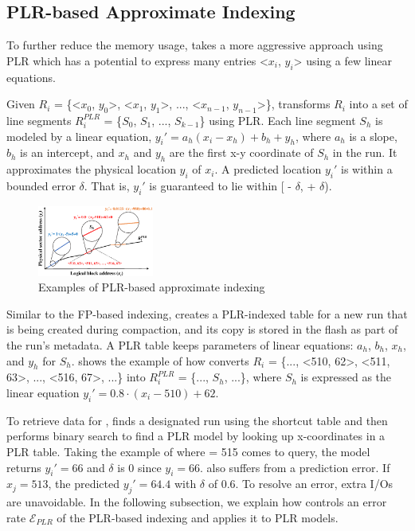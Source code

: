 \subsection{PLR-based Approximate Indexing}
\label{sec:design:plr-basic}

To further reduce the memory usage, \ours{} takes a more aggressive approach
using PLR which has a potential to
express many entries <$x_i$, $y_i$> using a few linear equations. 

Given $R_i$ = \{<$x_0$, $y_0$>, <$x_1$, $y_1$>, ..., <$x_{n-1}$, $y_{n-1}$>\},
\ours{} transforms $R_i$ into a set of line segments 
$R_i^{PLR}$ = \{$S_0$, $S_1$, ..., $S_{k-1}$\} using PLR.
Each line segment $S_h$ is modeled by a linear equation, $y_i'=a_h(x_i-x_h)+b_h+y_h$, 
where $a_h$ is a slope, $b_h$ is an intercept, and $x_h$ and $y_h$ are
the first x-y coordinate of $S_h$ in the run.
It approximates the physical location $y_i$ of $x_i$.
A predicted location $y_i'$ is within a bounded error $\delta$.
That is, $y_i'$ is guaranteed to lie within [ - $\delta$,  + $\delta$).

\begin{figure}[t]
\centering
\includegraphics[width=0.34\textwidth]{figs/OSDI/PLR_org.eps}

\caption{Examples of PLR-based approximate indexing}
\label{fig:plr_base}
\vspace{-5pt}
\end{figure}

Similar to the FP-based indexing, \ours{} creates a PLR-indexed table for a new run
that is being created during compaction, and its copy is stored in the flash as
part of the run's metadata.  A PLR table keeps parameters of linear
equations: $a_h$, $b_h$, $x_h$, and $y_h$ for $S_{h}$.
 shows the example of how \ours{} converts $R_i$ = \{...,
<510, 62>, <511, 63>, ..., <516, 67>, ...\} into $R_i^{PLR}$ = \{..., $S_h$,
...\}, where $S_h$ is expressed as the linear equation
$y_i'=0.8\cdot(x_i-510)+62$.

To retrieve data for , \ours{} finds a designated run using the shortcut table
and then performs binary search to find a PLR model by looking up x-coordinates
in a PLR table. Taking the example of  where  =
515 comes to query, the model returns $y_i'=66$ and $\delta$ is 0 since $y_i=66$. 
\ours{} also suffers from a prediction error. If $x_j=513$, the predicted
$y_j'=64.4$ with $\delta$ of 0.6.  To resolve an error, extra I/Os are
unavoidable.  In the following subsection, we explain how \ours{} controls an
error rate $\mathcal{E}_{PLR}$ of the PLR-based indexing and applies it to PLR
models.

